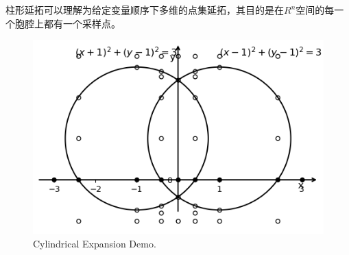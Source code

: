柱形延拓可以理解为给定变量顺序下多维的点集延拓，其目的是在$R^n$空间的每一个胞腔上都有一个采样点。
\begin{figure}[]
    \centering
    \includegraphics[width=0.9\columnwidth]{Img/cell4.png}
     {Cylindrical Expansion Demo.}
    \label{fig:expansion2}
\end{figure}
